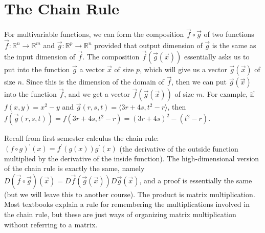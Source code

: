 \section{The Chain Rule}
For multivariable functions, we can form the composition $\vec f\circ \vec
g$ of two functions $\vec f:\mathbb{R}^n\to \mathbb{R}^m$ and $\vec
g:\mathbb{R}^p\to \mathbb{R}^n$ provided that output dimension of $\vec
g$ is the same as the input dimension of $\vec f$.  The composition
$\vec f(\vec g(\vec x))$ essentially asks us to put into the function
$\vec g$ a vector $\vec x$ of size $p$, which will give us a vector
$\vec g(\vec x)$ of size $n$.  Since this is the dimension of the
domain of $\vec f$, then we can put $\vec g(\vec x)$ into the function
$\vec f$, and we get a vector $\vec f(\vec g(\vec x))$ of size $m$.
For example, if $f(x,y)=x^2-y$ and $\vec
g(r,s,t)=\langle3r+4s,t^2-r\rangle$, then $f(\vec g(r,s,t)) =
f(3r+4s,t^2-r) = (3r+4s)^2-(t^2-r)$.

Recall from first semester calculus the chain rule: {$(f\circ g)^\prime(x) =
  f^\prime(g(x))g^\prime(x)$} (the derivative of the outside function multiplied
by the derivative of the inside function). The high-dimensional
version of the chain rule is exactly the same, namely {$D(\vec f\circ \vec
  g)(\vec x) = D\vec f(\vec g(\vec x))D\vec g(\vec x)$}, and a proof
is essentially the same (but we will leave this to another course).
The product is matrix multiplication. Most textbooks explain a rule
for remembering the multiplications involved in the chain rule, but
these are just ways of organizing matrix multiplication without
referring to a matrix.

